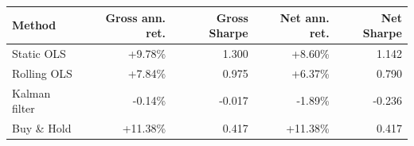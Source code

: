 \begin{tabular}{lrrrr}
\toprule
Method & Gross ann. ret. & Gross Sharpe & Net ann. ret. & Net Sharpe\\
\midrule
Static OLS & +9.78\% & 1.300 & +8.60\% & 1.142\\
Rolling OLS & +7.84\% & 0.975 & +6.37\% & 0.790\\
Kalman filter & -0.14\% & -0.017 & -1.89\% & -0.236\\
Buy \& Hold & +11.38\% & 0.417 & +11.38\% & 0.417\\
\bottomrule
\end{tabular}
